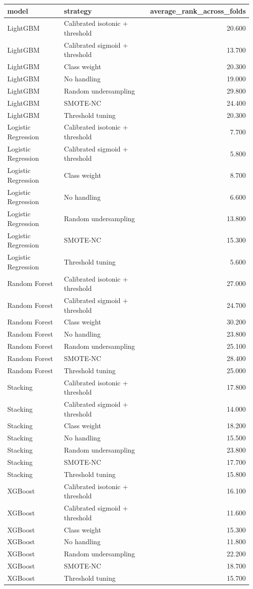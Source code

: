 \begin{tabular}{llr}
\toprule
model & strategy & average_rank_across_folds \\
\midrule
LightGBM & Calibrated isotonic + threshold & 20.600 \\
LightGBM & Calibrated sigmoid + threshold & 13.700 \\
LightGBM & Class weight & 20.300 \\
LightGBM & No handling & 19.000 \\
LightGBM & Random undersampling & 29.800 \\
LightGBM & SMOTE-NC & 24.400 \\
LightGBM & Threshold tuning & 20.300 \\
Logistic Regression & Calibrated isotonic + threshold & 7.700 \\
Logistic Regression & Calibrated sigmoid + threshold & 5.800 \\
Logistic Regression & Class weight & 8.700 \\
Logistic Regression & No handling & 6.600 \\
Logistic Regression & Random undersampling & 13.800 \\
Logistic Regression & SMOTE-NC & 15.300 \\
Logistic Regression & Threshold tuning & 5.600 \\
Random Forest & Calibrated isotonic + threshold & 27.000 \\
Random Forest & Calibrated sigmoid + threshold & 24.700 \\
Random Forest & Class weight & 30.200 \\
Random Forest & No handling & 23.800 \\
Random Forest & Random undersampling & 25.100 \\
Random Forest & SMOTE-NC & 28.400 \\
Random Forest & Threshold tuning & 25.000 \\
Stacking & Calibrated isotonic + threshold & 17.800 \\
Stacking & Calibrated sigmoid + threshold & 14.000 \\
Stacking & Class weight & 18.200 \\
Stacking & No handling & 15.500 \\
Stacking & Random undersampling & 23.800 \\
Stacking & SMOTE-NC & 17.700 \\
Stacking & Threshold tuning & 15.800 \\
XGBoost & Calibrated isotonic + threshold & 16.100 \\
XGBoost & Calibrated sigmoid + threshold & 11.600 \\
XGBoost & Class weight & 15.300 \\
XGBoost & No handling & 11.800 \\
XGBoost & Random undersampling & 22.200 \\
XGBoost & SMOTE-NC & 18.700 \\
XGBoost & Threshold tuning & 15.700 \\
\bottomrule
\end{tabular}
